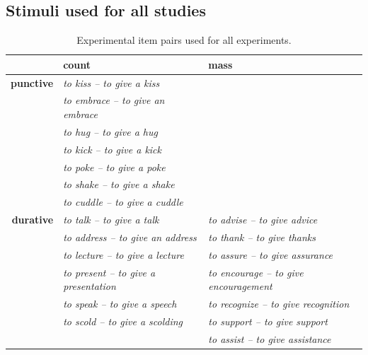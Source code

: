 \documentclass[preprint,12pt,authoryear]{elsarticle}
\begin{document}
\subsection{Stimuli used for all studies}
\label{sec_stims}
\begin{table}[h]
\hspace{-1cm}\noindent
\begin{tabular}{ r | l | l |  }
 			& 	\textbf{count} 				& 	\textbf{mass}  \\ \hline
\textbf{punctive} 		&	\emph{to kiss -- to give a kiss  }	& 		\cellcolor[gray]{.8}			\\ 
			&	\emph{to embrace -- to give an embrace} & \cellcolor[gray]{.8}\\
			&	\emph{to hug -- to give a hug} & \cellcolor[gray]{.8}\\
			& 	\emph{to kick -- to give a kick} & \cellcolor[gray]{.8}\\
			&	\emph{to poke -- to give a poke} & \cellcolor[gray]{.8}\\
			& 	\emph{to shake -- to give a shake} & \cellcolor[gray]{.8}\\
			&	\emph{to cuddle -- to give a cuddle }& \cellcolor[gray]{.8}\\ \hline
\textbf{durative}		&	\emph{to talk -- to give a talk}	&	\emph{to advise -- to give advice} \\
			&	\emph{to address -- to give an address}	&	\emph{to thank -- to give thanks}\\
			&	\emph{to lecture -- to give a lecture}	&	\emph{to assure -- to give assurance} \\
			&	\emph{to present -- to give a presentation}	&	\emph{to encourage -- to give encouragement} \\
			&	\emph{to speak -- to give a speech}	&	\emph{to recognize -- to give recognition} \\
			&	\emph{to scold -- to give a scolding}			&	\emph{to support -- to give support} \\
			&		 \cellcolor[gray]{.9}			&	 \emph{to assist -- to give assistance} \\\hline
			
\end{tabular}
\caption{Experimental item pairs used for all experiments.}
\label{ex_pairs}
\end{table}
\end{document}
